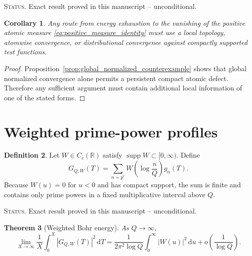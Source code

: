 \documentclass[11pt]{amsart}
\numberwithin{equation}{section}
\theoremstyle{plain}
\newtheorem{theorem}{Theorem}[section]
\newtheorem{corollary}[theorem]{Corollary}
\theoremstyle{definition}
\newtheorem{definition}[theorem]{Definition}
\theoremstyle{remark}
\newcommand{\1}{\mathbf{1}}
\newcommand{\dd}{\,\mathrm{d}}
\newcommand{\statusnote}[1]{%
  \par\smallskip\noindent
  \begingroup\footnotesize\textsc{Status.} #1\endgroup
  \par\smallskip}
\begin{document}
\statusnote{Exact result proved in this manuscript -- unconditional.}
\begin{corollary}
\label{cor:local_topology_required}
Any route from energy exhaustion to the vanishing of the positive atomic
measure \eqref{eq:positive_measure_identity} must use a local topology,
atomwise convergence, or distributional convergence against compactly
supported test functions.
\end{corollary}

\begin{proof}
Proposition~\ref{prop:global_normalized_counterexample} shows that global
normalized convergence alone permits a persistent compact atomic defect.
Therefore any sufficient argument must contain additional local
information of one of the stated forms.
\end{proof}

\section{Weighted prime-power profiles}
\label{sec:weighted_profiles}

\begin{definition}
\label{def:weighted_profile}
Let \(W\in C_c(\mathbb R)\) satisfy
\(\operatorname{supp}W\subset[0,\infty)\).  Define
\begin{equation}
G_{Q,W}(T)
=
\sum_{n=p^r}
W\left(\log\frac nQ\right)g_n(T).
\label{eq:weighted_profile_sum}
\end{equation}
Because \(W(u)=0\) for \(u<0\) and has compact support, the sum is finite
and contains only prime powers in a fixed multiplicative interval above
\(Q\).
\end{definition}

\statusnote{Exact result proved in this manuscript -- unconditional.}
\begin{theorem}[Weighted Bohr energy]
\label{thm:weighted_bohr_energy}
As $Q\to\infty$,
\begin{equation}
\lim_{X\to\infty}\frac1X\int_0^X|G_{Q,W}(T)|^2\dd T
=
\frac1{2\pi^2\log Q}
\int_0^\infty|W(u)|^2\dd u
+
o\left(\frac1{\log Q}\right).
\label{eq:weighted_bohr_energy}
\end{equation}
\end{theorem}
\end{document}
